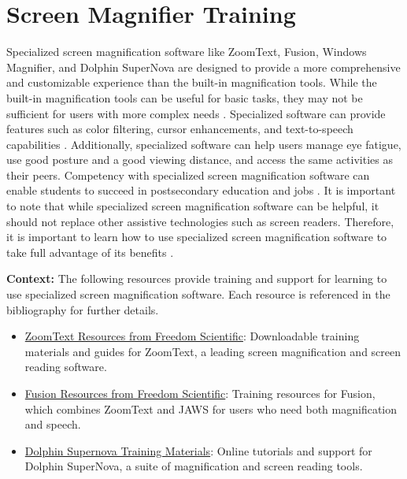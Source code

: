 \hypertarget{appx11}{}\section[Screen Magnifier Training]{Screen Magnifier Training}\label{appx11}
Specialized screen magnification software like ZoomText, Fusion, Windows Magnifier, and Dolphin SuperNova are designed to provide a more comprehensive and customizable experience than the built-in magnification tools. While the built-in magnification tools can be useful for basic tasks, they may not be sufficient for users with more complex needs \cite{BOIAScreenMagnifiers}. Specialized software can provide features such as color filtering, cursor enhancements, and text-to-speech capabilities \cite{PerkinsScreenMagnification}. Additionally, specialized software can help users manage eye fatigue, use good posture and a good viewing distance, and access the same activities as their peers. Competency with specialized screen magnification software can enable students to succeed in postsecondary education and jobs \cite{AFBScreenMagnification}. It is important to note that while specialized screen magnification software can be helpful, it should not replace other assistive technologies such as screen readers. Therefore, it is important to learn how to use specialized screen magnification software to take full advantage of its benefits \cite{LowVisionCenter}.

\noindent
\textbf{Context:} The following resources provide training and support for learning to use specialized screen magnification software. Each resource is referenced in the bibliography for further details.

\begin{itemize}
  \item \href{https://support.freedomscientific.com/teachers/resources/ZoomText\_resources.zip}{ZoomText Resources from Freedom Scientific}: Downloadable training materials and guides for ZoomText, a leading screen magnification and screen reading software.
  \item \href{https://support.freedomscientific.com/teachers/resources/Fusion\_resources.zip}{Fusion Resources from Freedom Scientific}: Training resources for Fusion, which combines ZoomText and JAWS for users who need both magnification and speech.
  \item \href{https://yourdolphin.com/support/tutorials}{Dolphin Supernova Training Materials}: Online tutorials and support for Dolphin SuperNova, a suite of magnification and screen reading tools.
 \end{itemize}

